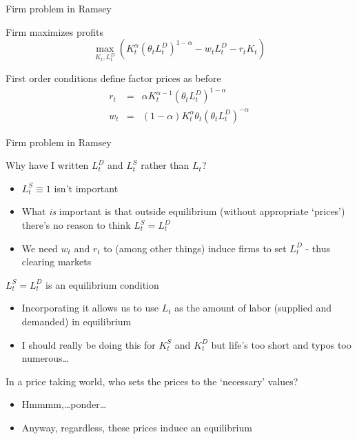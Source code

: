 \begin{frame}{Firm problem in Ramsey}

Firm maximizes profits
\begin{equation*}
\underset{K_{t},L^{D}_{t}}{\max }\left( K_{t}^{\alpha }\left( \theta_{t}L^{D}_{t}\right) ^{1-\alpha }-w_{t}L^{D}_{t}-r_{t}K_{t}\right)
\end{equation*}

First order conditions define factor prices as before
\begin{eqnarray*}
r_{t} &=&\alpha K_{t}^{\alpha -1}\left( \theta _{t}L^{D}_{t}\right) ^{1-\alpha }\\
w_{t} &=&\left( 1-\alpha \right) K_{t}^{\alpha }\theta _{t}\left( \theta_{t}L^{D}_{t}\right) ^{-\alpha }
\end{eqnarray*}

\end{frame}


\begin{frame}{Firm problem in Ramsey}

Why have I written $L_{t}^{D}$ and $L_{t}^{S}$ rather than $L_{t}$?
\begin{itemize}
\item	$L_{t}^{S}\equiv 1$ isn't important
\item	What \textit{is} important is that outside equilibrium (without appropriate `prices') there's no reason to think $L_{t}^{S}=L_{t}^{D}$
\item	We need $w_{t}$ and $r_{t}$ to (among other things) induce firms to set $L_{t}^{D}$ - thus clearing markets
\end{itemize}

\vspace{1.5mm}
$L_{t}^{S}=L_{t}^{D}$ is an equilibrium condition
\begin{itemize}
\item	Incorporating it allows us to use $L_{t}$ as the amount of labor (supplied and demanded) in equilibrium
\item	I should really be doing this for $K_{t}^{S}$ and $K_{t}^{D}$ but life's too short and typos too numerous\ldots
\end{itemize}

\vspace{1.5mm}
In a price taking world, who sets the prices to the `necessary' values?
\begin{itemize}
\item	Hmmmm,\ldots ponder\ldots
\item	Anyway, regardless, these prices induce an equilibrium
\end{itemize}

\end{frame}

